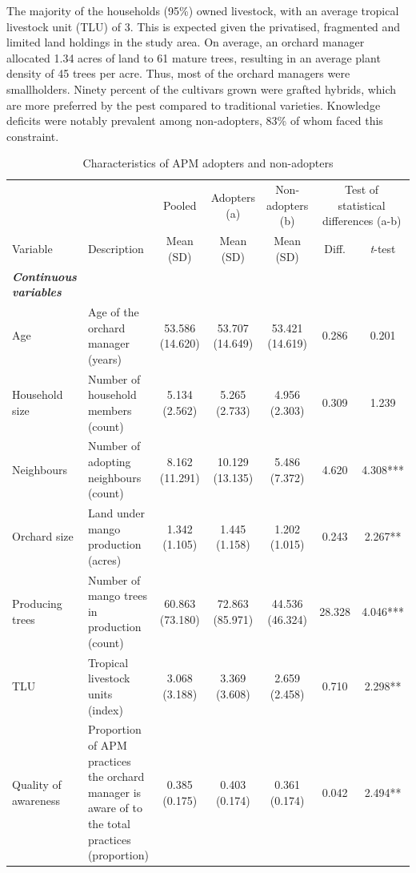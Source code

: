 \documentclass[fleqn,twoside,reqno]{article}
\begin{document}
The majority of the households (95\%) owned livestock, with an average tropical livestock unit (TLU) of 3. This is expected given the privatised, fragmented and limited land holdings in the study area. On average, an orchard manager allocated 1.34 acres of land to 61 mature trees, resulting in an average plant density of 45 trees per acre. Thus, most of the orchard managers were smallholders. Ninety percent of the cultivars grown were grafted hybrids, which are more preferred by the pest compared to traditional varieties. Knowledge deficits were notably prevalent among non-adopters, 83\% of whom faced this constraint.
\begin{table}
    \centering
    \caption{Characteristics of APM adopters and non-adopters}
    \label{tab:1}
    \small
    \begin{adjustbox}{width=1\textwidth, center}
        \begin{tabular}{l >{\raggedright\arraybackslash}p{8cm} ccccc}
            \toprule
            & & Pooled & Adopters (a) & Non-adopters (b) & \multicolumn{2}{c}{Test of statistical differences (a-b)}\\
            \cmidrule(lr){3-3} \cmidrule(lr){4-5} \cmidrule(lr){6-7}
            Variable & Description & Mean (SD) & Mean (SD) & Mean (SD) & Diff. & \textit{t}-test\\
            \midrule
            \textbf{\textit{Continuous variables}} & & & & & & \\
            Age & Age of the orchard manager (years) & 53.586 (14.620) & 53.707 (14.649) & 53.421 (14.619) & 0.286 & 0.201 \\
            Household size & Number of household members (count) & 5.134 (2.562) & 5.265 (2.733) & 4.956 (2.303) & 0.309 & 1.239 \\
            Neighbours & Number of adopting neighbours (count) & 8.162 (11.291) & 10.129 (13.135) & 5.486 (7.372) & 4.620 & 4.308*** \\
            Orchard size & Land under mango production (acres) & 1.342 (1.105) & 1.445 (1.158) & 1.202 (1.015) & 0.243 & 2.267** \\
            Producing trees & Number of mango trees in production (count) & 60.863 (73.180) & 72.863 (85.971) & 44.536 (46.324) & 28.328 & 4.046*** \\
            TLU & Tropical livestock units (index) & 3.068 (3.188) & 3.369 (3.608) & 2.659 (2.458) & 0.710 & 2.298** \\
            Quality of awareness & Proportion of APM practices the orchard manager is aware of to the total practices (proportion) & 0.385 (0.175) & 0.403 (0.174) & 0.361 (0.174) & 0.042 & 2.494** \\

\end{tabular}
\end{adjustbox}
\end{table}
\end{document}
